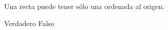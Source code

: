 Una recta puede tener sólo una ordenada al origen.

\begin{choices}
    \CorrectChoice Verdadero
    \choice Falso
\end{choices}